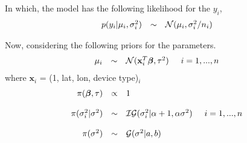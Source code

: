 \documentclass{asaproc}
\begin{document}
In which, the model has the following likelihood for the $y_{i}$, 
\begin{eqnarray*}
\begin{array}{lcl ll }
p(y_{i}|\mu_i, \sigma^2_i) & \sim & \mathcal{N} (\mu_i, \sigma_i^2/n_i) 
\end{array}
\end{eqnarray*}

Now, considering the following priors for the parameters.
\begin{eqnarray*}
\begin{array}{rcl}
\mu_i & \sim & \mathcal{N}(\textbf{x}^T_i\boldsymbol{\beta},\tau^2)  \hspace{0.5cm} i = 1,...,n
\end{array}
\end{eqnarray*}
\noindent
where $\textbf{x}_i$ = (1, lat, lon, device type)$_i$ 
\begin{eqnarray*}
\begin{array}{rcl}
\pi(\boldsymbol{\beta}, \tau) & \propto & 1\\\\

\pi(\sigma^2_i|\sigma^2) & \sim & \mathcal{IG}(\sigma^2_i|\alpha +1,\alpha\sigma^2) \hspace{0.5cm} i = 1,...,n \\\\

\pi(\sigma^2) & \sim & \mathcal{G}(\sigma^2|a,b)
\end{array}
\end{eqnarray*}
\end{document}
